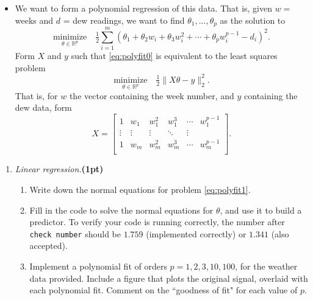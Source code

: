 \documentclass{article}
\newcommand{\showpoints}[1]{\textbf{(#1)}}
\begin{document}
\begin{enumerate}
\begin{itemize}
\item We want to form a polynomial regression of this data. That is, given $w = $ weeks and $d$ = dew readings, we want to find $\theta_1,...,\theta_p$ as the solution to
\begin{equation}
\underset{\theta\in \mathbb R^p}{\text{minimize}} \quad \tfrac{1}{2}\sum_{i=1}^m (\theta_1 + \theta_2 w_i + \theta_3 w_i^2 + \cdots + \theta_{p} w_i^{p-1} - d_i)^2.
\label{eq:polyfit0}
\end{equation}
Form $X$ and $y$ such that \eqref{eq:polyfit0} is equivalent to the least squares problem
\begin{equation}
\underset{\theta\in \mathbb R^p}{\text{minimize}} \quad \tfrac{1}{2}\|X\theta - y\|_2^2.
\label{eq:polyfit1}
\end{equation}
That is, for $w$ the vector containing the week number, and $y$ containing the dew data, form 
\[
X = \begin{bmatrix}
1 & w_1 & w_1^2&  w_1^3 &\cdots &w_1^{p-1}\\
\vdots& \vdots & \vdots & \ddots & \vdots\\
1 & w_m & w_m^2&  w_m^3 &\cdots &w_m^{p-1}\\
\end{bmatrix}.
\]

\end{itemize}
\begin{enumerate}
\item  \emph{Linear regression.}\showpoints{1pt} 
\begin{enumerate}
\item Write down the normal equations for problem \eqref{eq:polyfit1}. 

\item Fill in the code to solve the normal equations for $\theta$, and use it to build a predictor.
To verify your code is running correctly, the number after \texttt{check number} should be   $1.759$ (implemented correctly) or $1.341$ (also accepted).


\item Implement a polynomial fit of orders $p = 1,2,3,10,100$, for the weather data provided. Include a figure that plots the original signal, overlaid with each polynomial fit. Comment on the ``goodness of fit" for each value of $p$.



\end{enumerate}
\end{enumerate}
\end{enumerate}
\end{document}
